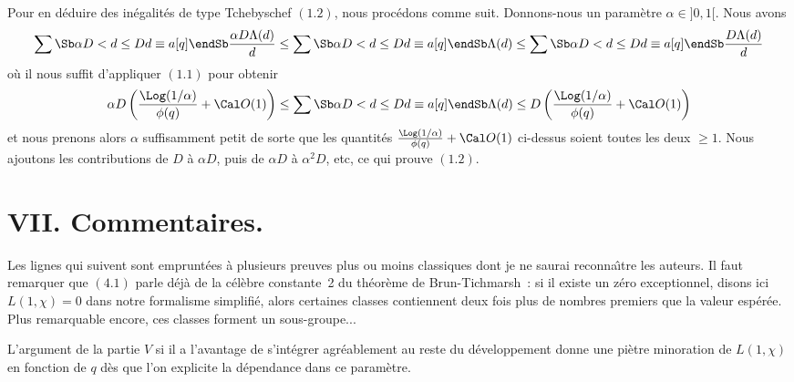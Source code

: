 Pour en d\'eduire des in\'egalit\'es de type Tchebyschef $(1.2)$, nous
proc\'edons comme suit. Donnons-nous un param\`etre $\alpha\in]0,1[$.
Nous avons
$$
\sum\Sb \alpha D< d\le D\\ d\equiv a[q]\endSb\frac{\alpha D\Lambda(d)}{d}
\le
\sum\Sb \alpha D< d\le D\\ d\equiv a[q]\endSb\Lambda(d)
\le
\sum\Sb \alpha D< d\le D\\ d\equiv a[q]\endSb\frac{D\Lambda(d)}{d}
$$
o\`u il nous suffit d'appliquer $(1.1)$ pour obtenir
$$
\alpha D\left(\frac{\Log(1/\alpha)}{\phi(q)}+\Cal O(1)\right)
\le
\sum\Sb \alpha D< d\le D\\ d\equiv a[q]\endSb\Lambda(d)
\le
D\left(\frac{\Log(1/\alpha)}{\phi(q)}+\Cal O(1)\right)
$$
et nous prenons alors $\alpha$ suffisamment petit de sorte que les
quantit\'es $\frac{\Log(1/\alpha)}{\phi(q)}+\Cal O(1)$
ci-dessus soient toutes les deux $\ge1$. Nous ajoutons les
contributions de $D$ \`a $\alpha D$, puis de $\alpha D$ \`a $\alpha^2
D$, etc, ce qui prouve $(1.2)$.


\section{VII. Commentaires.}

Les lignes qui suivent sont emprunt\'ees \`a plusieurs preuves
plus ou moins classiques dont je ne saurai reconna\^\i tre les
auteurs. Il faut remarquer que $(4.1)$ parle d\'ej\`a de la
c\'el\`ebre constante~2 du th\'eor\`eme de Brun-Tichmarsh~: si il
existe un z\'ero exceptionnel, disons ici $L(1,\chi)=0$ dans notre
formalisme simplifi\'e, alors certaines classes contiennent deux fois
plus de nombres premiers que la valeur esp\'er\'ee. Plus remarquable
encore, ces classes forment un sous-groupe...

L'argument de la partie $V$ si il a l'avantage de s'int\'egrer
agr\'eablement au reste du d\'eveloppement donne une pi\`etre
minoration de $L(1,\chi)$ en fonction de $q$ d\`es que l'on explicite
la d\'ependance dans ce param\`etre.


\enddocument

